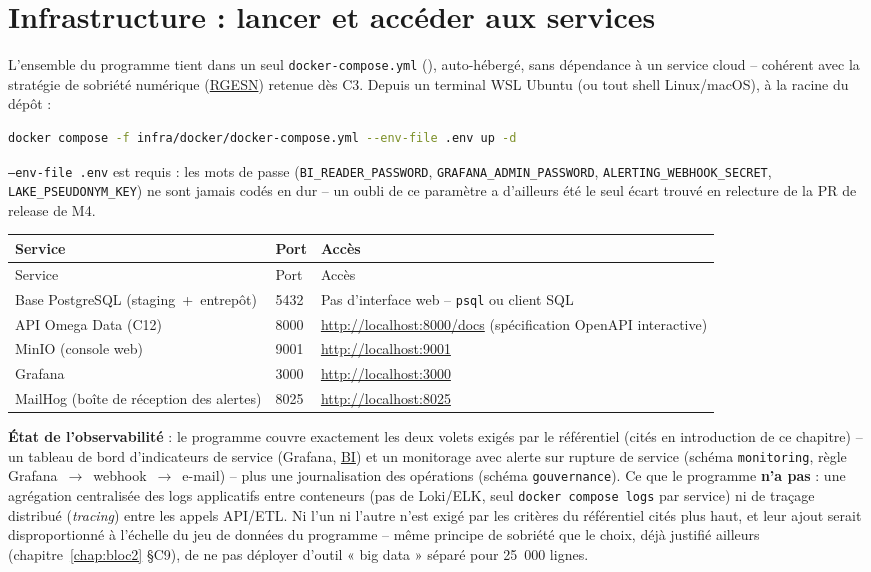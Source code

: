 \section{Infrastructure : lancer et accéder aux services}

L'ensemble du programme tient dans un seul \texttt{docker-compose.yml}
(), auto-hébergé, sans
dépendance à un service cloud -- cohérent avec la stratégie de
sobriété numérique (\hyperref[gloss:rgesn]{RGESN}) retenue dès C3. Depuis un terminal WSL
Ubuntu (ou tout shell Linux/macOS), à la racine du dépôt :

\begin{lstlisting}[language=bash,caption={Lancement de l'ensemble des services (tous blocs confondus)}]
docker compose -f infra/docker/docker-compose.yml --env-file .env up -d
\end{lstlisting}

\texttt{--env-file .env} est requis : les mots de passe (\texttt{BI\_READER\_PASSWORD},
\texttt{GRAFANA\_ADMIN\_PASSWORD}, \texttt{ALERTING\_WEBHOOK\_SECRET},
\texttt{LAKE\_PSEUDONYM\_KEY}) ne sont jamais codés en dur -- un oubli
de ce paramètre a d'ailleurs été le seul écart trouvé en relecture de
la PR de release de M4.

\begin{longtable}{@{}p{3.6cm}p{2.4cm}p{8.6cm}@{}}
\toprule
Service & Port & Accès \\
\midrule
\endfirsthead
\toprule
Service & Port & Accès \\
\midrule
\endhead
\bottomrule
\endfoot
Base PostgreSQL (staging~+~entrepôt) & 5432 & Pas d'interface web -- \texttt{psql} ou client SQL \\
API Omega Data (C12) & 8000 & \url{http://localhost:8000/docs} (spécification OpenAPI interactive) \\
MinIO (console web) & 9001 & \url{http://localhost:9001} \\
Grafana & 3000 & \url{http://localhost:3000} \\
MailHog (boîte de réception des alertes) & 8025 & \url{http://localhost:8025} \\
\end{longtable}

\textbf{État de l'observabilité} : le programme couvre exactement les
deux volets exigés par le référentiel (cités en introduction de ce
chapitre) -- un tableau de bord d'indicateurs de
service (Grafana, \hyperref[gloss:bi]{BI}) et un monitorage avec
alerte sur rupture de service (schéma \texttt{monitoring}, règle
Grafana~$\rightarrow$~webhook~$\rightarrow$~e-mail) -- plus une
journalisation des opérations (schéma \texttt{gouvernance}). Ce que le
programme \textbf{n'a pas} : une agrégation centralisée des logs
applicatifs entre conteneurs (pas de Loki/ELK, seul
\texttt{docker compose logs} par service) ni de traçage distribué
(\textit{tracing}) entre les appels API/ETL. Ni l'un ni l'autre n'est
exigé par les critères du référentiel cités plus haut, et leur ajout
serait disproportionné à l'échelle du jeu de données du programme --
même principe de sobriété que le choix, déjà justifié ailleurs
(chapitre~\ref{chap:bloc2} §C9), de ne pas déployer d'outil « big
data » séparé pour 25~000 lignes.

